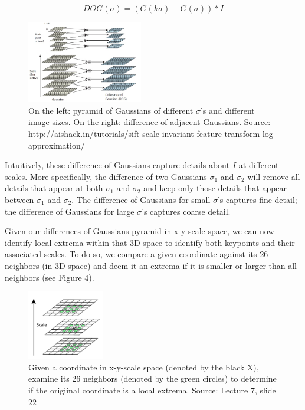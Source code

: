 \documentclass{article}
\begin{document}
$$DOG(\sigma) = (G(k\sigma) - G(\sigma)) * I$$

\begin{figure}[h]
  \centering
  \includegraphics[width=0.45\textwidth]{dog_pyramid}
  \caption{On the left: pyramid of Gaussians of different $\sigma$'s and different image sizes. On the right: difference of adjacent Gaussians. Source: http://aishack.in/tutorials/sift-scale-invariant-feature-transform-log-approximation/}
\end{figure}

Intuitively, these difference of Gaussians capture details about $I$ at different scales. More specifically, the difference of two Gaussians $\sigma_1$ and $\sigma_2$ will remove all details that appear at both $\sigma_1$ and $\sigma_2$ and keep only those details that appear between $\sigma_1$ and $\sigma_2$. The difference of Gaussians for small $\sigma$'s captures fine detail; the difference of Gaussians for large $\sigma$'s captures coarse detail.

Given our differences of Gaussians pyramid in x-y-scale space, we can now identify local extrema within that 3D space to identify both keypoints and their associated scales. To do so, we compare a given coordinate against its 26 neighbors (in 3D space) and deem it an extrema if it is smaller or larger than all neighbors (see Figure 4).

\begin{figure}[h]
  \centering
  \includegraphics[width=0.3\textwidth]{maxima}
  \caption{Given a coordinate in x-y-scale space (denoted by the black X), examine its 26 neighbors (denoted by the green circles) to determine if the origiinal coordinate is a local extrema. Source: Lecture 7, slide 22}
\end{figure}
\end{document}
